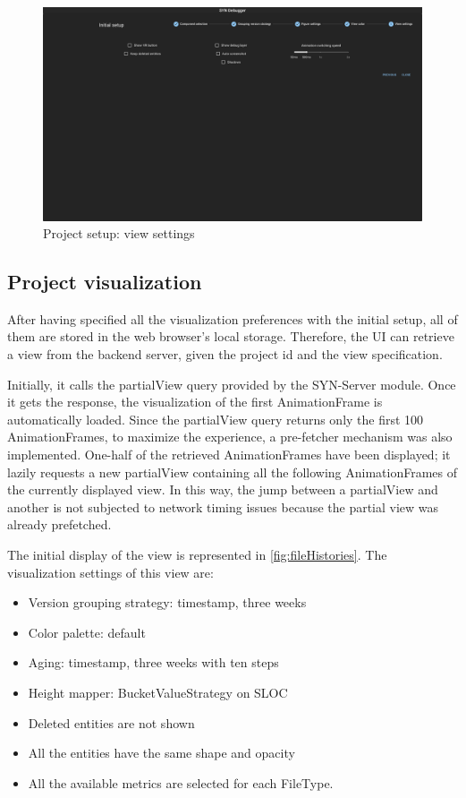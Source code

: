 \begin{figure}
    \center
    \includegraphics[width=\textwidth]{SYNUI-settings5.png}
    \caption{Project setup: view settings}
    \label{fig:SYNUIsettings5}
\end{figure}

\subsection*{Project visualization}
After having specified all the visualization preferences with the initial setup, all of them are stored in the web browser's local storage. 
Therefore, the UI can retrieve a view from the backend server, given the project id and the view specification. 

Initially, it calls the partialView query provided by the SYN-Server module. Once it gets the response, the visualization of the first AnimationFrame is automatically loaded. 
Since the partialView query returns only the first 100 AnimationFrames, to maximize the experience, a pre-fetcher mechanism was also implemented. 
One-half of the retrieved AnimationFrames have been displayed; it lazily requests a new partialView containing all the following AnimationFrames of the currently displayed view. 
In this way, the jump between a partialView and another is not subjected to network timing issues because the partial view was already prefetched. 
\bigbreak

The initial display of the view is represented in \autoref{fig:fileHistories}. The visualization settings of this view are:
\begin{itemize}
    \item Version grouping strategy: timestamp, three weeks
    \item Color palette: default
    \item Aging: timestamp, three weeks with ten steps
    \item Height mapper: BucketValueStrategy on SLOC
    \item Deleted entities are not shown
    \item All the entities have the same shape and opacity
    \item All the available metrics are selected for each FileType. 
\end{itemize}

